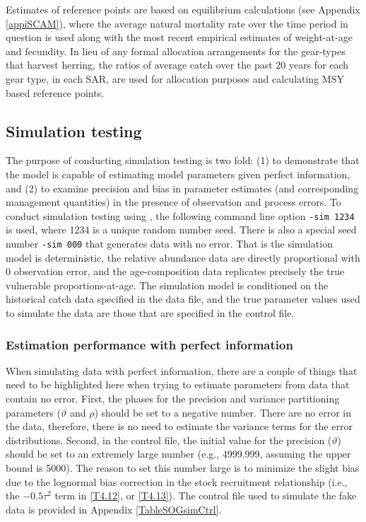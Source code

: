 	Estimates of reference points are based on equilibrium calculations (see Appendix \ref{appiSCAM}), where the average natural mortality rate over the time period in question is used along with the most recent empirical estimates of weight-at-age and fecundity.  In lieu of any formal allocation arrangements for the gear-types that harvest herring, the ratios of average catch over the past 20 years for each gear type, in each SAR, are used for allocation purposes and calculating MSY based reference points. 
	
	
	

	
	\subsection{Simulation testing}
	
		The purpose of conducting simulation testing is two fold: (1) to demonstrate that the model is capable of estimating model parameters given perfect information, and (2) to examine precision and bias in parameter estimates (and corresponding management quantities) in the presence of observation and process errors.  To conduct simulation testing using \iscam, the following command line option \verb"-sim 1234" is used, where 1234 is a unique random number seed.  There is also a special seed number \verb"-sim 000" that generates data with no error.  That is the simulation model is deterministic, the relative abundance data are directly proportional with 0 observation error, and the age-composition data replicates precisely the true vulnerable proportions-at-age.  The simulation model is conditioned on the historical catch data specified in the data file, and the true parameter values used to simulate the data are those that are specified in the control file.

	
		\subsubsection{Estimation performance with perfect information}
		 
When simulating data with perfect information, there are a couple of things that need to be highlighted here when trying to estimate parameters from data that contain no error.  First, the phases for the precision and variance partitioning parameters ($\vartheta$ and $\rho$) should be set to a negative number.  There are no error in the data, therefore, there is no need to estimate the variance terms for the error distributions.  Second, in the control file, the initial value for the precision ($\vartheta$) should be set to an extremely large number (e.g., 4999.999, assuming the upper bound is 5000).  The reason to set this number large is to minimize the slight bias due to the lognormal bias correction in the stock recruitment relationship (i.e., the $-0.5\tau^2$ term in \ref{T4.12}, or \ref{T4.13}). The control file used to simulate the fake data is provided in Appendix \ref{TableSOGsimCtrl}.




